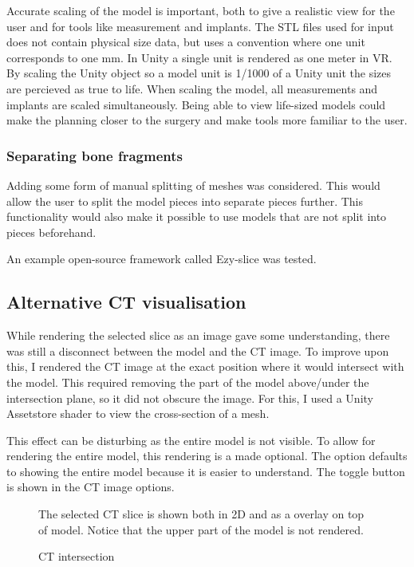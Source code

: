 \documentclass[a4paper]{report}
\begin{document}
Accurate scaling of the model is important, both to give a realistic view for the user and for tools like measurement and implants. The STL files used for input does not contain physical size data, but uses a convention where one unit corresponds to one mm. In Unity a single unit is rendered as one meter in VR. By scaling the Unity object so a model unit is 1/1000 of a Unity unit the sizes are percieved as true to life. When scaling the model, all measurements and implants are scaled simultaneously.
Being able to view life-sized models could make the planning closer to the surgery and make tools more familiar to the user.

\subsubsection{Separating bone fragments}
Adding some form of manual splitting of meshes was considered. This would allow the user to split the model pieces into separate pieces further. This functionality would also make it possible to use models that are not split into pieces beforehand.

An example open-source framework called Ezy-slice\cite{arayan_davidarayanezy-slice_2022} was tested.

\subsection{Alternative CT visualisation}
While rendering the selected slice as an image gave some understanding, there was still a disconnect between the model and the CT image. To improve upon this, I rendered the CT image at the exact position where it would intersect with the model.
This required removing the part of the model above/under the intersection plane, so it did not obscure the image. For this, I used a Unity Assetstore shader to view the cross-section of a mesh\cite{aldandarawy_unity_2019}.

This effect can be disturbing as the entire model is not visible. To allow for rendering the entire model, this rendering is a made optional. The option defaults to showing the entire model because it is easier to understand.
The toggle button is shown in the CT image options.

\begin{figure}[h!]
    \centering
	\hfill
  \caption{CT intersection}
  \small
  The selected CT slice is shown both in 2D and as a overlay on top of model. Notice that the upper part of the model is not rendered.
\end{figure}
\end{document}
